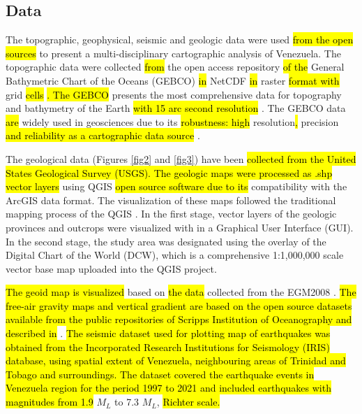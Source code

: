 \documentclass[sustainability,article,submit,pdftex,moreauthors]{Definitions/mdpi}
\begin{document}
\subsection{Data}
The topographic, geophysical, seismic and geologic data\hl{ }were used \hl{from the open sources }to present a multi-disciplinary cartographic analysis of Venezuela. The topographic data were collected \hl{from }the open access repository \hl{of the }General Bathymetric Chart of the Oceans (GEBCO) \hl{in }NetCDF \hl{in }raster \hl{format with }grid \hl{cells }\cite{GEBCO}\hl{. The GEBCO }presents the most comprehensive data for topography and bathymetry of the Earth \hl{with 15 arc second resolution } \cite{Schenke}. The GEBCO data\hl{ are }widely used in geosciences due to its \hl{robustness: high }resolution\hl{, }precision\hl{ and reliability as a cartographic data source }\citep{Mcmichael,Cortina}. 

The geological data (Figures \ref{fig2} and \ref{fig3}) have been \hl{collected from the United States Geological Survey (USGS). The geologic maps were processed as .shp vector layers} using\hl{ }QGIS \hl{open source software due to its} compatibility\hl{ }with the ArcGIS data format. The visualization of these maps followed the traditional mapping process of the QGIS \cite{Lemenkova2022a}. In the first stage, vector layers of the geologic provinces and outcrops were visualized with in a Graphical User Interface (GUI). In the second stage, the study area was designated using the overlay of the Digital Chart of the World (DCW), which is a comprehensive 1:1,000,000 scale vector base map uploaded into the QGIS project. 

\hl{The geoid map is visualized} based on \hl{the data }collected from the EGM2008 \cite{Pavlis}. \hl{The free-air gravity maps and vertical gradient are based on the open source datasets available from the public repositories of Scripps Institution of Oceanography and described in} \cite{Sandwell}. \hl{The seismic dataset used for plotting map of earthquakes was obtained from the Incorporated Research Institutions for Seismology (IRIS) database, using spatial extent of Venezuela, neighbouring areas of Trinidad and Tobago and surroundings. The dataset covered the earthquake events in Venezuela region  for the period 1997 to 2021 and included earthquakes with magnitudes from 1.9} $M_L$ to 7.3 $M_L$, \hl{Richter scale.}
\end{document}
